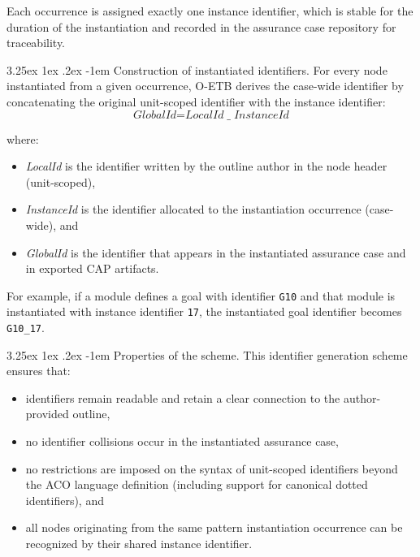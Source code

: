 \documentclass[12pt,twoside,a4paper]{article}
\makeatletter
\renewcommand\paragraph{\@startsection{paragraph}{5}{\z@}%
  {3.25ex \@plus1ex \@minus.2ex}%
  {-1em}%
  {\normalfont\normalsize\bfseries}}
\makeatother
\begin{document}
Each occurrence is assigned exactly one instance identifier, which is stable for
the duration of the instantiation and recorded in the assurance case repository
for traceability.

\paragraph{Construction of instantiated identifiers.}
For every node instantiated from a given occurrence, O-ETB derives the
case-wide identifier by concatenating the original unit-scoped identifier
with the instance identifier:
\[
\textit{GlobalId} = \textit{LocalId} \; \texttt{\_} \; \textit{InstanceId}
\]

where:
\begin{itemize}
  \item \textit{LocalId} is the identifier written by the outline author in the
        node header (unit-scoped),
  \item \textit{InstanceId} is the identifier allocated to the instantiation
        occurrence (case-wide), and
  \item \textit{GlobalId} is the identifier that appears in the instantiated
        assurance case and in exported CAP artifacts.
\end{itemize}

For example, if a module defines a goal with identifier \texttt{G10} and that
module is instantiated with instance identifier \texttt{17}, the instantiated
goal identifier becomes \texttt{G10\_17}.

\paragraph{Properties of the scheme.}
This identifier generation scheme ensures that:
\begin{itemize}
  \item identifiers remain readable and retain a clear connection to the
        author-provided outline,
  \item no identifier collisions occur in the instantiated assurance case,
  \item no restrictions are imposed on the syntax of unit-scoped identifiers
        beyond the ACO language definition (including support for canonical
        dotted identifiers), and
  \item all nodes originating from the same pattern instantiation occurrence
        can be recognized by their shared instance identifier.
\end{itemize}
\end{document}
